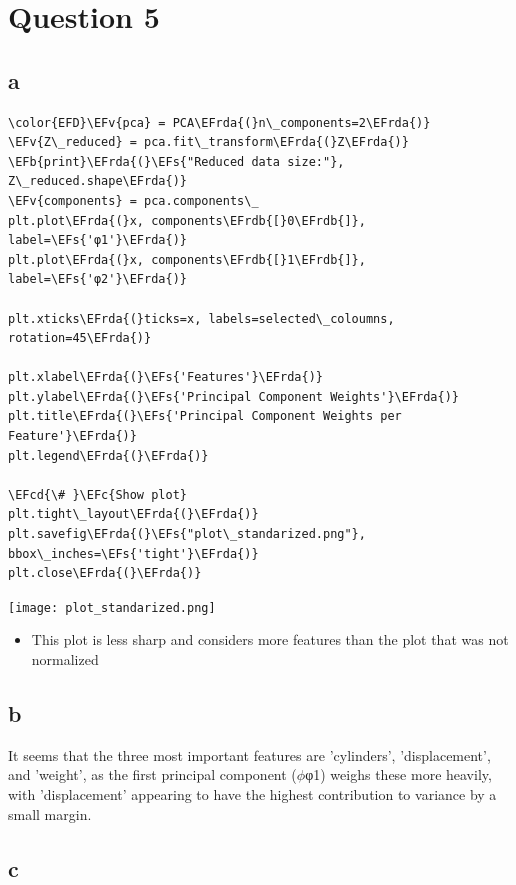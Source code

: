 \documentclass[11pt]{article}
\newcommand{\EFc}[1]{\textcolor{EFc}{#1}} %
\newcommand{\EFcd}[1]{\textcolor{EFcd}{#1}} %
\newcommand{\EFs}[1]{\textcolor{EFs}{#1}} %
\newcommand{\EFb}[1]{\textcolor{EFb}{#1}} %
\newcommand{\EFv}[1]{\textcolor{EFv}{#1}} %
\newcommand{\EFrda}[1]{\textcolor{EFrda}{#1}} %
\newcommand{\EFrdb}[1]{\textcolor{EFrdb}{#1}} %
\begin{document}
\section*{Question 5}
\label{sec:orge922b12}
\subsection*{a}
\label{sec:org9c8bb26}

\begin{Code}
\begin{Verbatim}
\color{EFD}\EFv{pca} = PCA\EFrda{(}n\_components=2\EFrda{)}
\EFv{Z\_reduced} = pca.fit\_transform\EFrda{(}Z\EFrda{)}
\EFb{print}\EFrda{(}\EFs{"Reduced data size:"}, Z\_reduced.shape\EFrda{)}
\EFv{components} = pca.components\_
plt.plot\EFrda{(}x, components\EFrdb{[}0\EFrdb{]}, label=\EFs{'φ1'}\EFrda{)}
plt.plot\EFrda{(}x, components\EFrdb{[}1\EFrdb{]}, label=\EFs{'φ2'}\EFrda{)}

plt.xticks\EFrda{(}ticks=x, labels=selected\_coloumns, rotation=45\EFrda{)}

plt.xlabel\EFrda{(}\EFs{'Features'}\EFrda{)}
plt.ylabel\EFrda{(}\EFs{'Principal Component Weights'}\EFrda{)}
plt.title\EFrda{(}\EFs{'Principal Component Weights per Feature'}\EFrda{)}
plt.legend\EFrda{(}\EFrda{)}

\EFcd{\# }\EFc{Show plot}
plt.tight\_layout\EFrda{(}\EFrda{)}
plt.savefig\EFrda{(}\EFs{"plot\_standarized.png"}, bbox\_inches=\EFs{'tight'}\EFrda{)}
plt.close\EFrda{(}\EFrda{)}
\end{Verbatim}
\end{Code}

\begin{center}
\texttt{[image: plot\_standarized.png]}
\end{center}
\begin{itemize}
\item This plot is less sharp and considers more features than the plot that was not normalized
\end{itemize}

\subsection*{b}
\label{sec:org1542d22}
It seems that the three most important features are 'cylinders', 'displacement', and 'weight', as the first principal component (\(\phi\)φ1) weighs these more heavily, with 'displacement' appearing to have the highest contribution to variance by a small margin.
\subsection*{c}
\label{sec:orgabb94d6}
\end{document}

